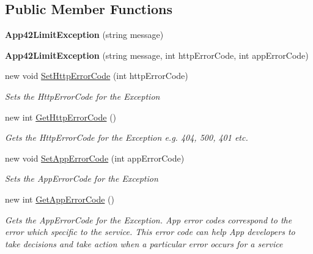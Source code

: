 \subsection*{Public Member Functions}
\begin{DoxyCompactItemize}
\item 
\hypertarget{classcom_1_1shephertz_1_1app42_1_1paas_1_1sdk_1_1csharp_1_1_app42_limit_exception_ac98c7c58d010aa0bf91cc23e1a3260be}{{\bfseries App42\+Limit\+Exception} (string message)}\label{classcom_1_1shephertz_1_1app42_1_1paas_1_1sdk_1_1csharp_1_1_app42_limit_exception_ac98c7c58d010aa0bf91cc23e1a3260be}

\item 
\hypertarget{classcom_1_1shephertz_1_1app42_1_1paas_1_1sdk_1_1csharp_1_1_app42_limit_exception_ab17a56216361854b0c3a8045c3a26895}{{\bfseries App42\+Limit\+Exception} (string message, int http\+Error\+Code, int app\+Error\+Code)}\label{classcom_1_1shephertz_1_1app42_1_1paas_1_1sdk_1_1csharp_1_1_app42_limit_exception_ab17a56216361854b0c3a8045c3a26895}

\item 
new void \hyperlink{classcom_1_1shephertz_1_1app42_1_1paas_1_1sdk_1_1csharp_1_1_app42_limit_exception_a9da551e98341110327877e615b22b2c2}{Set\+Http\+Error\+Code} (int http\+Error\+Code)
\begin{DoxyCompactList}\small\item\em Sets the Http\+Error\+Code for the Exception \end{DoxyCompactList}\item 
new int \hyperlink{classcom_1_1shephertz_1_1app42_1_1paas_1_1sdk_1_1csharp_1_1_app42_limit_exception_a8b0c0208e0f1742a70b890c989aa745f}{Get\+Http\+Error\+Code} ()
\begin{DoxyCompactList}\small\item\em Gets the Http\+Error\+Code for the Exception e.\+g. 404, 500, 401 etc. \end{DoxyCompactList}\item 
new void \hyperlink{classcom_1_1shephertz_1_1app42_1_1paas_1_1sdk_1_1csharp_1_1_app42_limit_exception_a1ee2eb73cf69177ea2fbde293b3de8e8}{Set\+App\+Error\+Code} (int app\+Error\+Code)
\begin{DoxyCompactList}\small\item\em Sets the App\+Error\+Code for the Exception \end{DoxyCompactList}\item 
new int \hyperlink{classcom_1_1shephertz_1_1app42_1_1paas_1_1sdk_1_1csharp_1_1_app42_limit_exception_ae4ead4af2bffd0efdece74aa090519fb}{Get\+App\+Error\+Code} ()
\begin{DoxyCompactList}\small\item\em Gets the App\+Error\+Code for the Exception. App error codes correspond to the error which specific to the service. This error code can help App developers to take decisions and take action when a particular error occurs for a service \end{DoxyCompactList}\end{DoxyCompactItemize}


